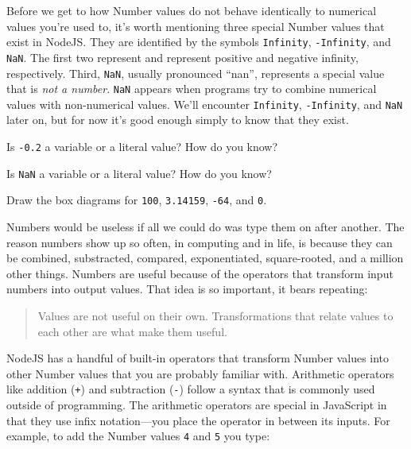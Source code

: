 Before we get to how \textsf{Number} values do not behave identically to numerical values you're used to, it's worth mentioning three special \textsf{Number} values that exist in NodeJS. They are identified by the symbols \texttt{Infinity}, \texttt{-Infinity}, and \texttt{NaN}. The first two represent and represent positive and negative infinity, respectively. Third, \texttt{NaN}, usually pronounced ``nan'', represents a special value that is \emph{not a number}. \texttt{NaN} appears when programs try to combine numerical values with non-numerical values. We'll encounter \texttt{Infinity}, \texttt{-Infinity}, and \texttt{NaN} later on, but for now it's good enough simply to know that they exist.

\begin{question}
  Is \texttt{-0.2} a variable or a literal value? How do you know?
\end{question}

\begin{question}
  Is \texttt{NaN} a variable or a literal value? How do you know?
\end{question}

\begin{question}
  Draw the box diagrams for \texttt{100}, \texttt{3.14159}, \texttt{-64}, and \texttt{0}.
\end{question}

Numbers would be useless if all we could do was type them on after another. The reason numbers show up so often, in computing and in life, is because they can be combined, substracted, compared, exponentiated, square-rooted, and a million other things. Numbers are useful because of the operators that transform input numbers into output values. That idea is so important, it bears repeating:

\begin{quotation}
  Values are not useful on their own. Transformations that relate values to each other are what make them useful.
\end{quotation}

NodeJS has a handful of built-in operators that transform \textsf{Number} values into other \textsf{Number} values that you are probably familiar with. Arithmetic operators like addition (\texttt{+}) and subtraction (\texttt{-}) follow a syntax that is commonly used outside of programming. The arithmetic operators are special in JavaScript in that they use infix notation---you place the operator in between its inputs. For example, to add the \textsf{Number} values \texttt{4} and \texttt{5} you type:

